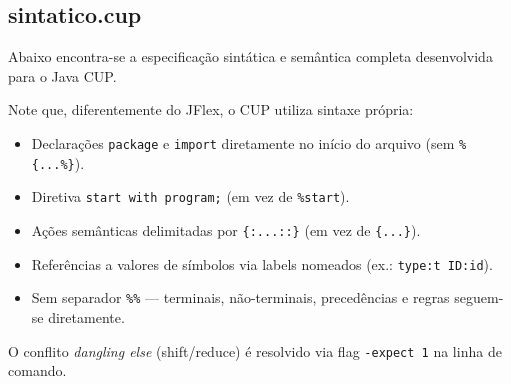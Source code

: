 \documentclass[a4paper,12pt]{article}
\begin{document}
\subsection{sintatico.cup}
Abaixo encontra-se a especificação sintática e semântica completa desenvolvida para o Java CUP.

Note que, diferentemente do JFlex, o CUP utiliza sintaxe própria:
\begin{itemize}
  \item Declarações \texttt{package} e \texttt{import} diretamente no início do arquivo (sem \texttt{\%\{...\%\}}).
  \item Diretiva \texttt{start with program;} (em vez de \texttt{\%start}).
  \item Ações semânticas delimitadas por \texttt{\{:...::\}} (em vez de \texttt{\{...\}}).
  \item Referências a valores de símbolos via labels nomeados (ex.: \texttt{type:t ID:id}).
  \item Sem separador \texttt{\%\%} — terminais, não-terminais, precedências e regras seguem-se diretamente.
\end{itemize}

O conflito \textit{dangling else} (shift/reduce) é resolvido via flag \texttt{-expect 1} na linha de comando.
\end{document}
